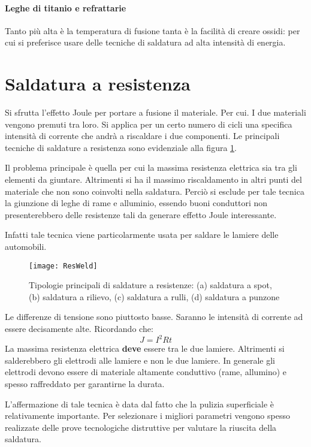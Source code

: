 \paragraph{Leghe di titanio e refrattarie} Tanto più alta è la temperatura di fusione tanta è la facilità di creare ossidi: per cui si preferisce usare delle tecniche di saldatura ad alta intensità di energia.

\section{Saldatura a resistenza}
Si sfrutta l'effetto Joule per portare a fusione il materiale.
Per cui. I due materiali vengono premuti tra loro. Si applica per un certo numero di cicli una specifica intensità di corrente che andrà a riscaldare i due componenti.
Le principali tecniche di saldature a resistenza sono evidenziale alla figura \ref{fig:ResWeld}.

Il problema principale è quella per cui la massima resistenza elettrica sia tra gli elementi da giuntare. Altrimenti si ha il massimo riscaldamento in altri punti del materiale che non sono coinvolti nella saldatura.
Perciò si esclude per tale tecnica la giunzione di leghe di rame e alluminio, essendo buoni conduttori non presenterebbero delle resistenze tali da generare effetto Joule interessante.

Infatti tale tecnica viene particolarmente usata per saldare le lamiere delle automobili.

\begin{figure}
\centering
\texttt{[image: ResWeld]}
\caption{Tipologie principali di saldature a resistenze: (a) saldatura a spot, (b) saldatura a rilievo, (c) saldatura a rulli, (d) saldatura a punzone}
\label{fig:ResWeld}
\end{figure}

Le differenze di tensione sono piuttosto basse. Saranno le intensità di corrente ad essere decisamente alte. Ricordando che:
\begin{equation}
J = I^2Rt
\end{equation}
La massima resistenza elettrica \textbf{deve} essere tra le due lamiere.
Altrimenti si salderebbero gli elettrodi alle lamiere e non le due lamiere.
In generale gli elettrodi devono essere di materiale altamente conduttivo (rame, allumino) e spesso raffreddato per garantirne la durata.

L'affermazione di tale tecnica è data dal fatto che la pulizia superficiale è relativamente importante. Per selezionare i migliori parametri vengono spesso realizzate delle prove tecnologiche distruttive per valutare la riuscita della saldatura.


